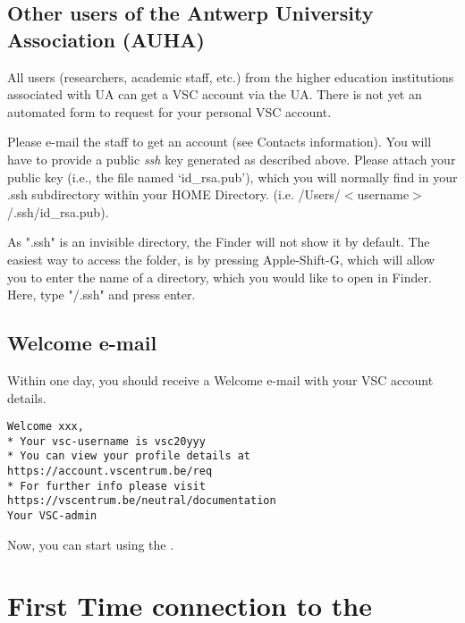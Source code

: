 \subsection{Other users of the Antwerp University Association (AUHA)}
\label{sec:other-users-of-antwerp-university}

All users (researchers, academic staff, etc.) from the higher education
institutions associated with UA can get a VSC account via the UA. There is not
yet an automated form to request for your personal VSC account.

Please e-mail the \hpc staff to get an account (see Contacts information).
You will have to provide a public \textit{ssh} key generated as described
above. Please attach your public key (i.e., the file named `id\_rsa.pub'),
which you will normally find in your .ssh subdirectory within your HOME
Directory. (i.e. /Users/$<$username$>$/.ssh/id\_rsa.pub).


\ifmac

  \textbf{} As ".ssh" is an invisible directory, the Finder will
  not show it by default. The easiest way to access the folder, is by pressing
  Apple-Shift-G, which will allow you to enter the name of a directory, which
  you would like to open in Finder. Here, type "\tilde/.ssh" and press enter.

\fi
\fi

\subsection{Welcome e-mail}
\label{sec:welcome-email}

Within one day, you should receive a Welcome e-mail with your VSC account details.

\begin{verbatim}
Welcome xxx,
* Your vsc-username is vsc20yyy
* You can view your profile details at https://account.vscentrum.be/req
* For further info please visit https://vscentrum.be/neutral/documentation
Your VSC-admin
\end{verbatim}

Now, you can start using the \hpc.

\section{First Time connection to the \hpc}
\label{sec:first-time-connection-to-the-hpc}

\ifwindows


